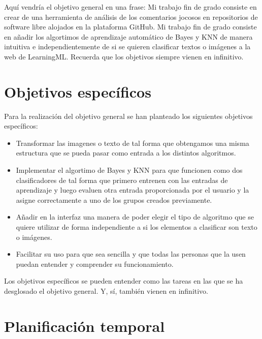 \documentclass[a4paper, 12pt]{book}
\begin{document}
Aquí vendría el objetivo general en una frase:
Mi trabajo fin de grado consiste en crear de una herramienta de análisis de los comentarios jocosos en repositorios de software libre alojados en la plataforma GitHub.
Mi trabajo fin de grado consiste en añadir los algortimos de aprendizaje automático de Bayes y KNN de manera intuitiva e independientemente de si se quieren clasificar textos o imágenes a la web de LearningML.
Recuerda que los objetivos siempre vienen en infinitivo.


\section{Objetivos específicos}
\label{sec:objetivos-especificos}

Para la realización del objetivo general se han planteado los siguientes objetivos específicos:
\begin{itemize}
  
  \item Transformar las imagenes o texto de tal forma que obtengamos una misma estructura que se pueda pasar como entrada a los distintos algoritmos.
 
  \item Implementar el algortimo de Bayes y KNN para que funcionen como dos clasificadores de tal forma que primero entrenen con las entradas de aprendizaje y luego evaluen otra entrada proporcionada por el usuario y la asigne correctamente a uno de los grupos creados previamente.
  
  \item Añadir en la interfaz una manera de poder elegir el tipo de algoritmo que se quiere utilizar de forma independiente a si los elementos a clasificar son texto o imágenes.

  \item Facilitar su uso para que sea sencilla y que todas las personas que la usen puedan entender y comprender su funcionamiento.

\end{itemize}
Los objetivos específicos se pueden entender como las tareas en las que se ha desglosado el objetivo general.
Y, sí, también vienen en infinitivo.


\section{Planificación temporal}
\label{sec:planificacion-temporal}
\end{document}
